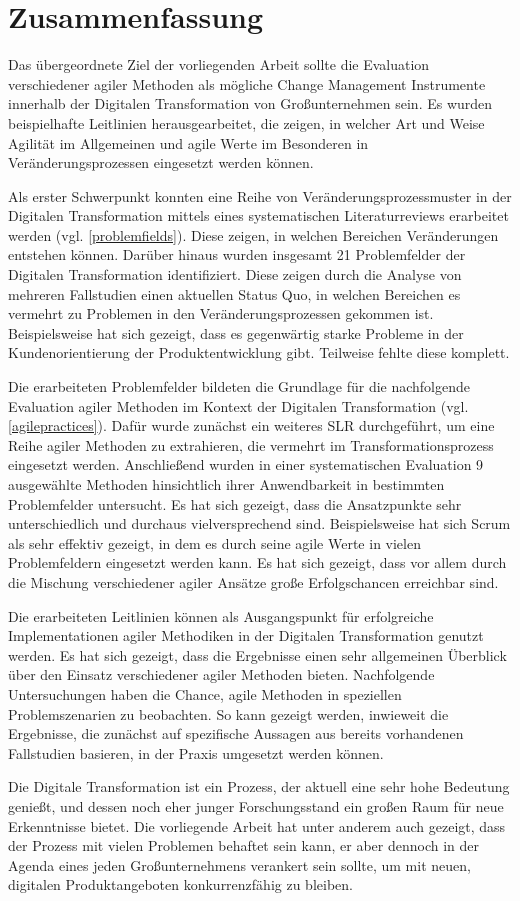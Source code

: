 \chapter{Zusammenfassung}
\label{conclusion}

Das übergeordnete Ziel der vorliegenden Arbeit sollte die Evaluation verschiedener agiler Methoden als mögliche Change Management Instrumente innerhalb der Digitalen Transformation von Großunternehmen sein. Es wurden beispielhafte Leitlinien herausgearbeitet, die zeigen, in welcher Art und Weise Agilität im Allgemeinen und agile Werte im Besonderen in Veränderungsprozessen eingesetzt werden können.

Als erster Schwerpunkt konnten eine Reihe von Veränderungsprozessmuster in der Digitalen Transformation mittels eines systematischen Literaturreviews erarbeitet werden (vgl. \ref{problemfields}). Diese zeigen, in welchen Bereichen Veränderungen entstehen können. Darüber hinaus wurden insgesamt 21 Problemfelder der Digitalen Transformation identifiziert. Diese zeigen durch die Analyse von mehreren Fallstudien einen aktuellen Status Quo, in welchen Bereichen es vermehrt zu Problemen in den Veränderungsprozessen gekommen ist. Beispielsweise hat sich gezeigt, dass es gegenwärtig starke Probleme in der Kundenorientierung der Produktentwicklung gibt. Teilweise fehlte diese komplett.

Die erarbeiteten Problemfelder bildeten die Grundlage für die nachfolgende Evaluation agiler Methoden im Kontext der Digitalen Transformation (vgl.  \ref{agilepractices}). Dafür wurde zunächst ein weiteres SLR durchgeführt, um eine Reihe agiler Methoden zu extrahieren, die vermehrt im Transformationsprozess eingesetzt werden. Anschließend wurden in einer systematischen Evaluation 9 ausgewählte Methoden hinsichtlich ihrer Anwendbarkeit in bestimmten Problemfelder untersucht. Es hat sich gezeigt, dass die Ansatzpunkte sehr unterschiedlich und durchaus vielversprechend sind. Beispielsweise hat sich Scrum als sehr effektiv gezeigt, in dem es durch seine agile Werte in vielen Problemfeldern eingesetzt werden kann. Es hat sich gezeigt, dass vor allem durch die Mischung verschiedener agiler Ansätze große Erfolgschancen erreichbar sind.

Die erarbeiteten Leitlinien können als Ausgangspunkt für erfolgreiche Implementationen agiler Methodiken in der Digitalen Transformation genutzt werden. Es hat sich gezeigt, dass die Ergebnisse einen sehr allgemeinen Überblick über den Einsatz verschiedener agiler Methoden bieten. Nachfolgende Untersuchungen haben die Chance, agile Methoden in speziellen Problemszenarien zu beobachten. So kann gezeigt werden, inwieweit die Ergebnisse, die zunächst auf spezifische Aussagen aus bereits vorhandenen Fallstudien basieren, in der Praxis umgesetzt werden können. 

Die Digitale Transformation ist ein Prozess, der aktuell eine sehr hohe Bedeutung genießt, und dessen noch eher junger Forschungsstand ein großen Raum für neue Erkenntnisse bietet. Die vorliegende Arbeit hat unter anderem auch gezeigt, dass der Prozess mit vielen Problemen behaftet sein kann, er aber dennoch in der Agenda eines jeden Großunternehmens verankert sein sollte, um mit neuen, digitalen Produktangeboten konkurrenzfähig zu bleiben.